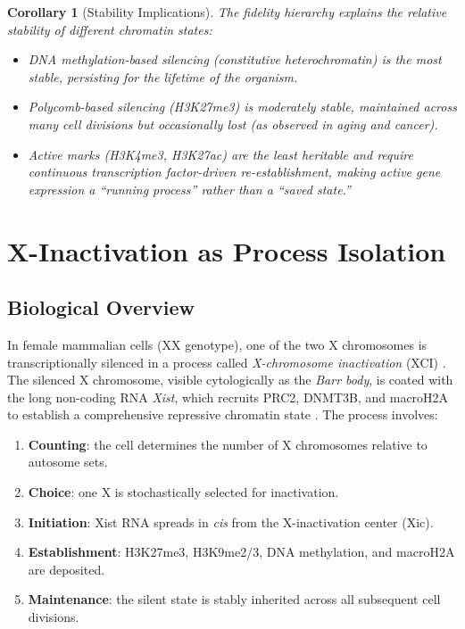 \documentclass[12pt,a4paper]{article}
\newtheorem{corollary}[theorem]{Corollary}
\begin{document}
\begin{corollary}[Stability Implications]
\label{cor:stability}
The fidelity hierarchy explains the relative stability of different chromatin states:
\begin{itemize}
    \item DNA methylation-based silencing (constitutive heterochromatin) is the most stable, persisting for the lifetime of the organism.
    \item Polycomb-based silencing (H3K27me3) is moderately stable, maintained across many cell divisions but occasionally lost (as observed in aging and cancer).
    \item Active marks (H3K4me3, H3K27ac) are the least heritable and require continuous transcription factor-driven re-establishment, making active gene expression a ``running process'' rather than a ``saved state.''
\end{itemize}
\end{corollary}

\section{X-Inactivation as Process Isolation}
\label{sec:x-inact}

\subsection{Biological Overview}

In female mammalian cells (XX genotype), one of the two X chromosomes is transcriptionally silenced in a process called \emph{X-chromosome inactivation} (XCI) \cite{lyon1961}. The silenced X chromosome, visible cytologically as the \emph{Barr body}, is coated with the long non-coding RNA \emph{Xist}, which recruits PRC2, DNMT3B, and macroH2A to establish a comprehensive repressive chromatin state \cite{brockdorff2015}. The process involves:

\begin{enumerate}[label=(\roman*)]
    \item \textbf{Counting}: the cell determines the number of X chromosomes relative to autosome sets.
    \item \textbf{Choice}: one X is stochastically selected for inactivation.
    \item \textbf{Initiation}: Xist RNA spreads in \emph{cis} from the X-inactivation center (Xic).
    \item \textbf{Establishment}: H3K27me3, H3K9me2/3, DNA methylation, and macroH2A are deposited.
    \item \textbf{Maintenance}: the silent state is stably inherited across all subsequent cell divisions.
\end{enumerate}
\end{document}
